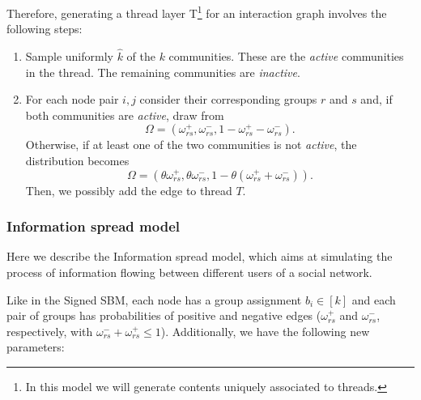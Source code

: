 Therefore, generating a thread layer T\footnote{In this model we will generate
	contents uniquely associated to threads.} for an interaction graph
involves the following steps:
\begin{enumerate}
	\item Sample uniformly $\hat{k}$ of the $k$ communities. These are the
	      \emph{active} communities in the thread. The remaining communities
	      are \emph{inactive}.
	\item For each node pair $i, j$ consider their corresponding groups $r$ and
	      $s$ and, if both communities are \emph{active},
	      draw from
	      \begin{equation*}
		      \Omega = (\omega _{rs} ^{+}, \omega _{rs} ^{-}, 1 - \omega _{rs}
		      ^{+} - \omega _{rs} ^{-}).
	      \end{equation*}
	      Otherwise, if at least one of the
	      two communities is not \emph{active}, the distribution becomes
	      \begin{equation*}
		      \Omega = (\theta \omega _{rs} ^{+}, \theta \omega _{rs} ^{-}, 1 - \theta
		      (\omega _{rs} ^{+} + \omega _{rs} ^{-})).
	      \end{equation*}
	      Then, we possibly add the edge to thread $T$.

\end{enumerate}

\subsubsection{Information spread model}%
\label{ssub:information_spread_model}

Here we describe the Information spread model, which aims at simulating the
process of information flowing between different users of a social network.

Like in the Signed SBM, each node has a group assignment $b_i \in [k]$ and
each pair of groups has probabilities of
positive and negative edges ($\omega _{rs}^{+}  $ and $\omega _{rs}^{-}  $,
respectively, with $\omega ^{-} _{rs} + \omega ^{+} _{rs}
	\leq 1$).
Additionally, we have the following new parameters:

